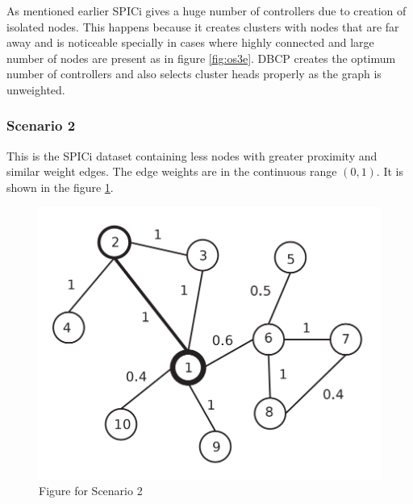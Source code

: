 \documentclass[8pt]{extarticle}
\begin{document}
	
	As mentioned earlier SPICi gives a huge number of controllers due to creation of isolated nodes. This happens because it creates clusters with nodes that are far away  and is noticeable specially in cases where highly connected and large number of nodes are present as in figure \ref{fig:os3e}. DBCP creates the optimum number of controllers and also selects cluster heads properly as the graph is unweighted.
	
	\subsubsection{Scenario 2}
	This is the SPICi dataset containing less nodes with greater proximity and similar weight edges. The edge weights are in the continuous range $(0,1)$. It is shown in the figure \ref{fig:spici}.
	\begin{figure}
		\includegraphics[width=\linewidth]{Spici.png}
		\caption{Figure for Scenario 2}
		\label{fig:spici}
	\end{figure}
\end{document}
